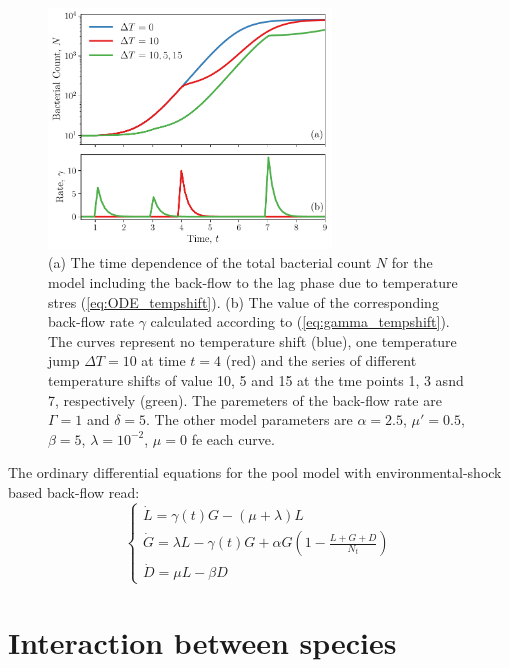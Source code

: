 \documentclass[10pt,A4paper]{article}
\begin{document}
\begin{figure}[t]
    \begin{center}
    \includegraphics[width=0.67\textwidth]{Figures/pool_model_3pools_resource_tempshift.pdf}
    \caption{{\footnotesize (a) The time dependence of the total bacterial count $N$ for the model including the back-flow to the lag phase due to temperature stres (\ref{eq:ODE_tempshift}).
    (b) The value of the corresponding back-flow rate $\gamma$ calculated according to (\ref{eq:gamma_tempshift}).
    The curves represent no temperature shift (blue), one temperature jump $\Delta T = 10$ at time $t=4$ (red) 
    and the series of different temperature shifts of value 10, 5 and 15 at the tme points 1, 3 asnd 7, respectively (green).
    The paremeters of the back-flow rate are $\Gamma=1$ and $\delta=5$.
    The other model parameters are $\alpha=2.5$, $\mu'=0.5$, $\beta=5$, $\lambda=10^{-2}$, $\mu = 0$ fe each curve.
    }}
    \label{fig:TempJump}
    \end{center}
\end{figure}

The ordinary differential equations for the pool model with environmental-shock based back-flow read:
\begin{equation}
    \begin{cases}
    \dot{L} =\gamma(t) G - (\mu + \lambda) L\\
    \dot{G} = \lambda L -\gamma(t) G + \alpha G\left(1-\frac{L+G+D}{N_t}\right)\\
    \dot{D} = \mu  L - \beta D
    \label{eq:ODE_tempshift}
    \end{cases}
\end{equation}




\newpage

\section{Interaction between species}
\end{document}
